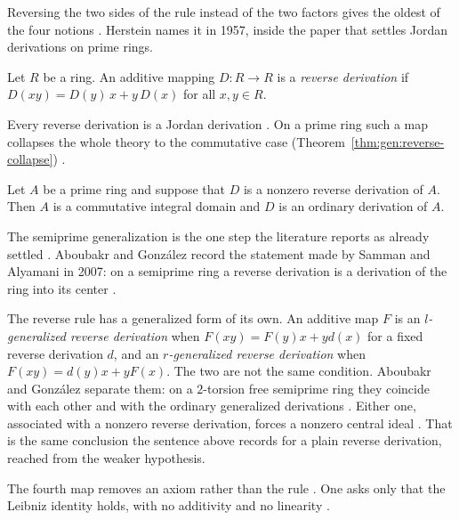Reversing the two sides of the rule instead of the two factors gives the
oldest of the four notions \cite[p.~1105]{Herstein1957}. Herstein names it
in 1957, inside the paper that settles Jordan derivations on prime rings.

\begin{definition}\label{def:gen:reverse-derivation}
Let $R$ be a ring. An additive mapping $D\colon R\to R$ is a \emph{reverse
derivation} if $D(xy)=D(y)\,x+y\,D(x)$ for all $x,y\in R$.
\end{definition}

Every reverse derivation is a Jordan derivation
\cite[p.~1105]{Herstein1957}. On a prime ring such a map collapses the
whole theory to the commutative case (Theorem~\ref{thm:gen:reverse-collapse}) \cite[p.~1106]{Herstein1957}.

\begin{theorem}\label{thm:gen:reverse-collapse}
Let $A$ be a prime ring and suppose that $D$ is a nonzero reverse derivation
of $A$. Then $A$ is a commutative integral domain and $D$ is an ordinary
derivation of $A$.
\end{theorem}

The semiprime generalization is the one step the literature reports as already
settled \cite[p.~200]{AboubakrGonzalez2015}. Aboubakr and Gonz\'{a}lez record
the statement made by Samman and Alyamani in 2007: on a semiprime ring a
reverse derivation is a derivation of the ring into its center
\cite[p.~200]{AboubakrGonzalez2015}.

The reverse rule has a generalized form of its own. An additive map $F$ is an
\emph{$l$-generalized reverse derivation} \cite[p.~199]{AboubakrGonzalez2015}
when $F(xy)=F(y)x+yd(x)$ for a fixed reverse derivation $d$, and an
\emph{$r$-generalized reverse derivation} \cite[p.~199]{AboubakrGonzalez2015}
when $F(xy)=d(y)x+yF(x)$. The two are not the
same condition. Aboubakr and Gonz\'{a}lez separate them: on a $2$-torsion free
semiprime ring they coincide with each other and with the ordinary generalized
derivations \cite[pp.~204--205]{AboubakrGonzalez2015}. Either one,
associated with a nonzero reverse derivation, forces a nonzero central ideal
\cite[Corollary~3.3]{AboubakrGonzalez2015}. That is the same conclusion the
sentence above records for a plain reverse derivation, reached from the weaker
hypothesis.

The fourth map removes an axiom rather than the rule
\cite[p.~190]{GoldmannSemrl1996}. One asks only that the Leibniz identity
holds, with no additivity and no linearity \cite[p.~190]{GoldmannSemrl1996}.

